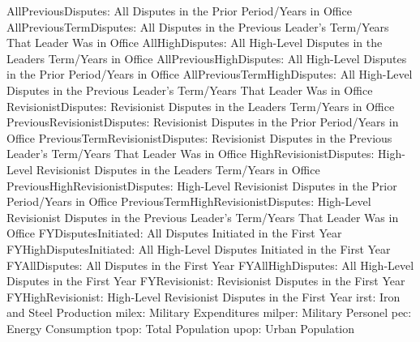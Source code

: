AllPreviousDisputes: All Disputes in the Prior Period/Years in Office                 
AllPreviousTermDisputes: All Disputes in the Previous Leader's Term/Years That Leader Was in Office            
AllHighDisputes: All High-Level Disputes in the Leaders Term/Years in Office                   
AllPreviousHighDisputes: All High-Level Disputes in the Prior Period/Years in Office             
AllPreviousTermHighDisputes: All High-Level Disputes in the Previous Leader's Term/Years That Leader Was in Office          
RevisionistDisputes: Revisionist Disputes in the Leaders Term/Years in Office                
PreviousRevisionistDisputes: Revisionist Disputes in the Prior Period/Years in Office          
PreviousTermRevisionistDisputes: Revisionist Disputes in the Previous Leader's Term/Years That Leader Was in Office      
HighRevisionistDisputes: High-Level Revisionist Disputes in the Leaders Term/Years in Office              
PreviousHighRevisionistDisputes: High-Level Revisionist Disputes in the Prior Period/Years in Office        
PreviousTermHighRevisionistDisputes: High-Level Revisionist Disputes in the Previous Leader's Term/Years That Leader Was in Office   
FYDisputesInitiated: All Disputes Initiated in the First Year                   
FYHighDisputesInitiated: All High-Level Disputes Initiated in the First Year             
FYAllDisputes: All Disputes in the First Year                           
FYAllHighDisputes: All High-Level Disputes in the First Year                   
FYRevisionist: Revisionist Disputes in the First Year                         
FYHighRevisionist: High-Level Revisionist Disputes in the First Year                  
irst: Iron and Steel Production                                 
milex: Military Expenditures                              
milper: Military Personel                              
pec: Energy Consumption                                
tpop: Total Population                                
upop: Urban Population    
